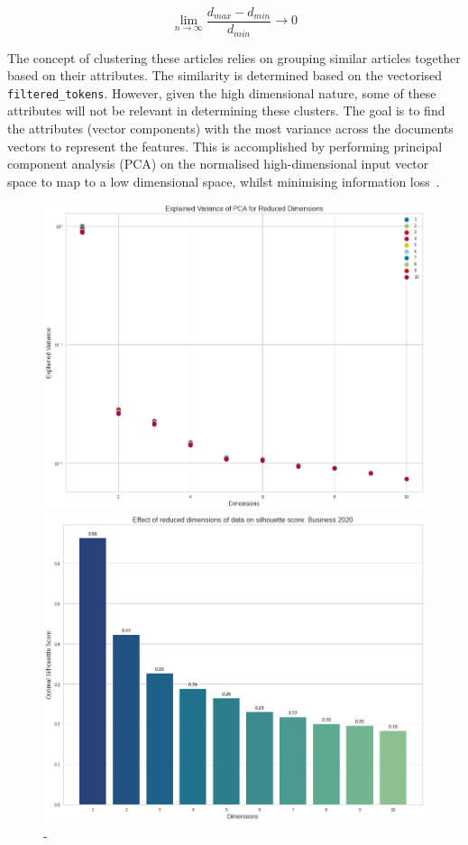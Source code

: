 \[ \lim_{n\to\infty} \frac{d_{max} - d_{min}}{d_{min}} \to0\]

The concept of clustering these articles relies on grouping similar articles together based on their attributes. The similarity is determined based on the vectorised \texttt{filtered\_tokens}. However, given the high dimensional nature, some of these attributes will not be relevant in determining these clusters. The goal is to find the attributes (vector components) with the most variance across the documents vectors to represent the features. This is accomplished by performing principal component analysis (PCA) on the normalised high-dimensional input vector space to map to a low dimensional space, whilst minimising information loss~\cite{pca_clustering}.

\begin{figure}[H]
  \centering
    \begin{minipage}[t]{.49\textwidth}
      \centering
      \includegraphics[width=\textwidth]{images/eval/explained_variances.png}
      \caption{-}
      \label{fig:explained_variance}
    \end{minipage}
    \begin{minipage}[t]{.49\textwidth}
      \centering
      \includegraphics[width=\textwidth]{images/eval/pca_silhouette.png}

\end{minipage}
\end{figure}
